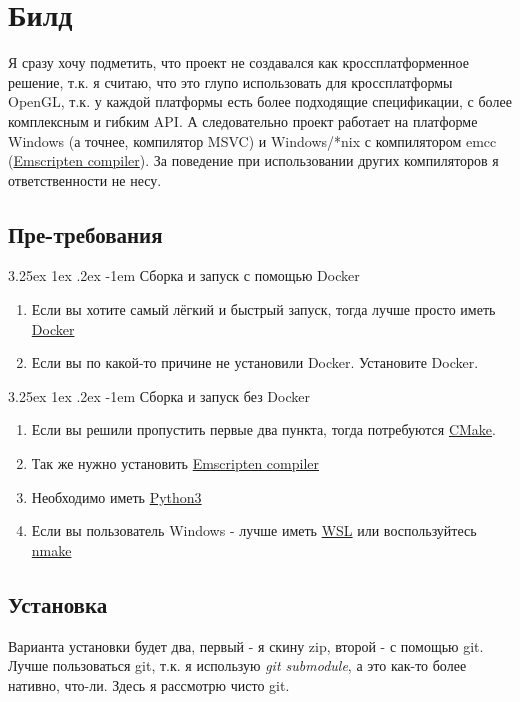 \documentclass[12pt]{article}
\makeatletter
\renewcommand\paragraph{\@startsection{paragraph}{5}{\z@}%
  {3.25ex \@plus1ex \@minus.2ex}%
  {-1em}%
  {\normalfont\normalsize\bfseries}}
\makeatother
\begin{document}
    \section{Билд}
    Я сразу хочу подметить, что проект не создавался как кроссплатформенное
    решение, т.к. я считаю, что это глупо использовать для кроссплатформы
    OpenGL, т.к. у каждой платформы есть более подходящие спецификации, с 
    более комплексным и гибким API. А следовательно проект работает на
    платформе Windows (а точнее, компилятор MSVC) и Windows/*nix 
    с компилятором emcc (\href{https://emscripten.org/}{Emscripten compiler}).
    За поведение при использовании других компиляторов я ответственности не 
    несу.
    \subsection{Пре-требования}
    \label{sec:pre_req}
    \paragraph{Сборка и запуск с помощью Docker}
    \begin{enumerate}
        \item Если вы хотите самый лёгкий и быстрый запуск, тогда лучше
        просто иметь \href{https://www.docker.com/}{Docker}
        \item Если вы по какой-то причине не установили Docker. Установите
        Docker.
    \end{enumerate}
    \paragraph{Сборка и запуск без Docker}
    \begin{enumerate}
        \item Если вы решили пропустить первые два пункта, тогда потребуются
        \href{https://cmake.org/}{CMake}.
        \item Так же нужно установить \href{https://emscripten.org/}{Emscripten compiler}
        \item Необходимо иметь \href{https://www.python.org/}{Python3} 
        \item Если вы пользователь Windows - лучше иметь 
        \href{https://docs.microsoft.com/ru-ru/windows/wsl/install-win10}{WSL}
        или воспользуйтесь \href{https://docs.microsoft.com/ru-ru/cpp/build/reference/nmake-reference?view=vs-2019}{nmake}
    \end{enumerate}
    \subsection{Установка}
    Варианта установки будет два, первый - я скину zip, второй - с помощью git.
    Лучше пользоваться git, т.к. я использую \emph{git submodule}, а 
    это как-то более нативно, что-ли. Здесь я рассмотрю чисто git.
\end{document}
